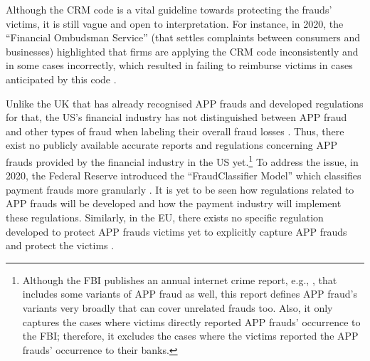 Although the CRM code is a vital guideline  towards protecting  the frauds' victims, it is still  vague and open to interpretation. For instance, in 2020, the ``Financial Ombudsman Service'' (that settles complaints between consumers and businesses)  highlighted that firms  are applying the CRM code inconsistently and in some cases incorrectly, which resulted in failing to reimburse victims in cases anticipated by this code \cite{Financial-Ombudsman-Service-response}.  %



Unlike the UK that has already recognised APP frauds and developed regulations for that,  the US's financial industry has not distinguished between APP fraud and other types of  fraud when labeling their overall fraud losses \cite{P20-report}. Thus, there exist no publicly available accurate reports and regulations concerning APP frauds provided by the financial industry in the US yet.\footnote{Although the FBI publishes  an annual internet crime report, e.g.,  \cite{internet-crime-report}, that includes some variants of APP fraud as well,  this report defines APP fraud's variants very broadly that can cover unrelated frauds too.  Also, it only captures the cases where victims directly reported  APP frauds' occurrence to the FBI; therefore, it excludes the cases where the victims reported the APP frauds' occurrence to their banks.}  To address the issue, in 2020, the Federal Reserve introduced the ``FraudClassifier Model'' which classifies payment frauds more granularly \cite{Fraud-Classifier}. It is yet to be seen how  regulations related to APP frauds  will be developed and how the payment industry will implement these regulations. Similarly, in the EU, there  exists no specific regulation developed to protect APP frauds victims yet
%
%
to explicitly capture APP frauds and protect the victims \cite{kjorven2020pays,McIlroy2021}.














